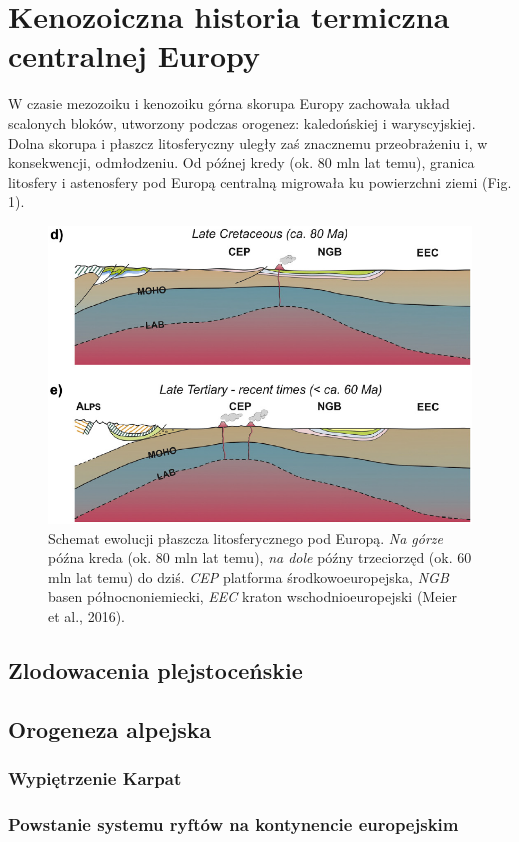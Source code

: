 \documentclass[11.5pt,twoside]{report}
\begin{document}
	
	\tableofcontents
	
	\chapter{Kenozoiczna historia termiczna centralnej Europy}
	
W czasie mezozoiku i kenozoiku górna skorupa Europy zachowała układ scalonych bloków, utworzony podczas orogenez: kaledońskiej i waryscyjskiej. Dolna skorupa i płaszcz litosferyczny uległy zaś znacznemu przeobrażeniu i, w konsekwencji, odmłodzeniu. Od pó\'{z}nej kredy (ok. 80 mln lat temu), granica litosfery i astenosfery pod Europą centralną migrowała ku powierzchni ziemi (Fig. 1). 

\begin{figure}[h]
	\centering
	\includegraphics[width=0.5\linewidth]{../Termika/Meier2016}
	\caption{Schemat ewolucji płaszcza litosferycznego pod Europą. \textit{Na górze} późna kreda (ok. 80 mln lat temu), \textit{na dole} późny trzeciorzęd (ok. 60 mln lat temu) do dziś. \textit{CEP} platforma środkowoeuropejska, \textit{NGB} basen północnoniemiecki, \textit{EEC} kraton wschodnioeuropejski (Meier et al., 2016).}
	\label{Fig.}
\end{figure}
	
	\section{Zlodowacenia plejstoceńskie}
	
	\section{Orogeneza alpejska}
	
	\subsection{Wypiętrzenie Karpat}
	
	\subsection{Powstanie systemu ryftów na kontynencie europejskim}
	
\end{document}
